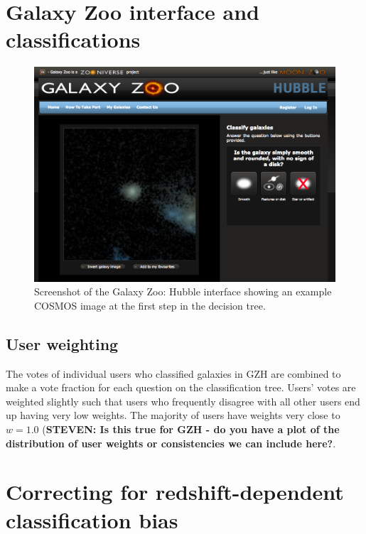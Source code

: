 \documentclass[usenatbib]{mn2e}
\begin{document}
\section{Galaxy Zoo interface and classifications}\label{sec:interface}

\begin{figure}
\includegraphics[width=160mm]{figures/gzh_interface.png}
\caption{Screenshot of the Galaxy Zoo: Hubble interface showing an example COSMOS image at the first step in the decision tree.\label{fig:interface}}
\end{figure}

\subsection{User weighting}\label{ssec:weighting}
The votes of individual users who classified galaxies in GZH are combined to make a vote fraction for each question on the classification tree. Users' votes are weighted slightly \citep[in a method identical to that described in][]{wil13} such that users who frequently disagree with all other users end up having very low weights. The majority of users have weights very close to $w=1.0$ ({\bf STEVEN: Is this true for GZH - do you have a plot of the distribution of user weights or consistencies we can include here?}. 


\section{Correcting for redshift-dependent classification bias}\label{sec:debiasing}
\end{document}
